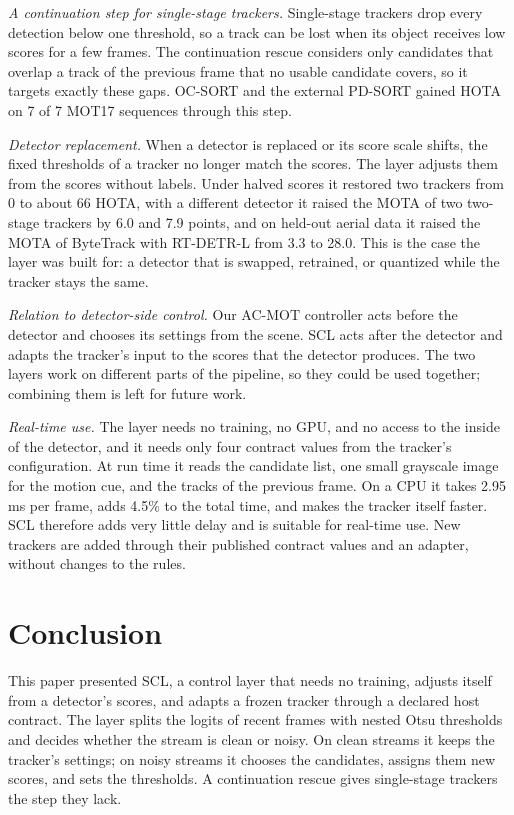 \documentclass[pdflatex,sn-mathphys-num,iicol]{sn-jnl}
\newcommand{\scl}{SCL}
\begin{document}
\emph{A continuation step for single-stage trackers.} Single-stage trackers
drop every detection below one threshold, so a track can be lost when its
object receives low scores for a few frames. The continuation rescue
considers only candidates that overlap a track of the previous frame that no
usable candidate covers, so it targets exactly these gaps. OC-SORT and the
external PD-SORT gained HOTA on 7 of 7 MOT17 sequences through this step.

\emph{Detector replacement.} When a detector is replaced or its score scale
shifts, the fixed thresholds of a tracker no longer match the scores. The
layer adjusts them from the scores without labels. Under halved scores it
restored two trackers from 0 to about 66 HOTA, with a different detector
it raised the MOTA of two two-stage trackers by 6.0 and 7.9 points, and on
held-out aerial data it raised the MOTA of ByteTrack with RT-DETR-L from 3.3
to 28.0. This is
the case the layer was built for: a detector that is swapped, retrained, or
quantized while the tracker stays the same.

\emph{Relation to detector-side control.} Our AC-MOT controller acts
before the detector and chooses its settings from the scene. \scl{}
acts after the detector and adapts the tracker's input to the scores that the
detector produces. The two layers work on different parts of the pipeline,
so they could be used together; combining them is left for future work.

\emph{Real-time use.} The layer needs no training, no GPU, and no access to
the inside of the detector, and it needs only four contract values from the
tracker's configuration. At run time it reads the candidate list, one small
grayscale image for the motion cue, and the tracks of the previous frame. On
a CPU it takes 2.95 ms per frame, adds 4.5\% to the total time, and makes the
tracker itself faster. \scl{} therefore adds very little delay and is
suitable for real-time use. New trackers are added through their published
contract values and an adapter, without changes to the rules.
\section{Conclusion}\label{sec:conclusion}

This paper presented \scl{}, a control layer that needs no training, adjusts
itself from a detector's scores, and adapts a frozen tracker through a
declared host contract. The layer splits the logits of recent frames with
nested Otsu thresholds and decides whether the stream is clean or noisy. On
clean streams it keeps the tracker's settings; on noisy streams it chooses
the candidates, assigns them new scores, and sets the thresholds. A
continuation rescue gives single-stage trackers the step they lack.
\end{document}
